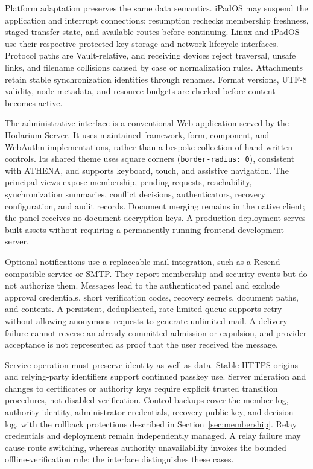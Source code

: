 \documentclass[11pt,a4paper]{article}
\theoremstyle{definition}
\theoremstyle{plain}
\begin{document}
Platform adaptation preserves the same data semantics. iPadOS may
suspend the application and interrupt connections; resumption rechecks
membership freshness, staged transfer state, and available routes before
continuing. Linux and iPadOS use their respective protected key storage
and network lifecycle interfaces. Protocol paths are Vault-relative,
and receiving devices reject traversal, unsafe links, and filename
collisions caused by case or normalization rules. Attachments retain
stable synchronization identities through renames. Format versions,
UTF-8 validity, node metadata, and resource budgets are checked before
content becomes active.

The administrative interface is a conventional Web application served
by the Hodarium Server. It uses maintained framework, form, component,
and WebAuthn implementations, rather than a bespoke collection of
hand-written controls. Its shared theme uses square corners
(\texttt{border-radius: 0}), consistent with ATHENA, and supports keyboard,
touch, and assistive navigation. The principal views expose membership,
pending requests, reachability, synchronization summaries, conflict
decisions, authenticators, recovery configuration, and audit records.
Document merging remains in the native client; the panel receives no
document-decryption keys. A production deployment serves built assets
without requiring a permanently running frontend development server.

Optional notifications use a replaceable mail integration, such as a
Resend-compatible service or SMTP. They report membership and security
events but do not authorize them. Messages lead to the authenticated
panel and exclude approval credentials, short verification codes,
recovery secrets, document paths, and contents. A persistent, deduplicated,
rate-limited queue supports retry without allowing anonymous requests
to generate unlimited mail. A delivery failure cannot reverse an
already committed admission or expulsion, and provider acceptance is
not represented as proof that the user received the message.

Service operation must preserve identity as well as data. Stable HTTPS
origins and relying-party identifiers support continued passkey use.
Server migration and changes to certificates or authority keys require
explicit trusted transition procedures, not disabled verification.
Control backups cover the member log, authority identity, administrator
credentials, recovery public key, and decision log, with the rollback
protections described in Section~\ref{sec:membership}. Relay credentials
and deployment remain independently managed. A relay failure may cause
route switching, whereas authority unavailability invokes the bounded
offline-verification rule; the interface distinguishes these cases.
\end{document}
